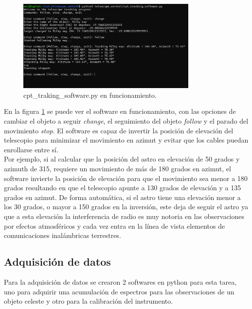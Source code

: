 \begin{figure}
    \centering
    \includegraphics[width=0.8\textwidth]{img/traking}
    \caption{cpt\_traking\_software.py en funcionamiento.}
    \label{fig:control}
\end{figure}

En la figura \ref{fig:control} se puede ver el software en funcionamiento, con las opciones de cambiar el objeto a seguir \textit{change}, el seguimiento del objeto \textit{follow} y el parado del movimiento \textit{stop}. El software es capaz de invertir la posición de elevación del telescopio para minimizar el movimiento en azimut y evitar que los cables puedan enrollarse entre sí.\\

Por ejemplo, si al calcular que la posición del astro en elevación de 50 grados y azimuth de 315, requiere un movimiento de más de 180 grados en azimut, el software invierte la posición de elevación para que el movimiento sea menor a 180 grados resultando en que el telescopio apunte a 130 grados de elevación y a 135 grados en azimut. De forma automática, si el astro tiene una elevación menor a los 30 grados, o mayor a 150 grados en la inversión, este deja de seguir el astro ya que a esta elevación la interferencia de radio es muy notoria en las observaciones por efectos atmosféricos y cada vez entra en la línea de vista elementos de comunicaciones inalámbricas terrestres.\\

\subsection{Adquisición de datos} 

Para la adquisición de datos se crearon 2 softwares en python para esta tarea, uno para adquirir una acumulación de espectros para las observaciones de un objeto celeste y otro para la calibración del instrumento.\\

